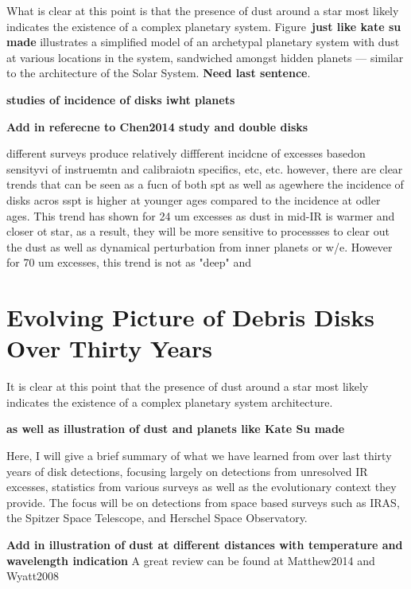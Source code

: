     What is clear at this point is that the presence of dust around a star most likely indicates the existence of a complex planetary system. Figure~\textbf{just like kate su made} illustrates a simplified model of an archetypal planetary system with dust at various locations in the system, sandwiched amongst hidden planets --- similar to the architecture of the Solar System. \textbf{Need last sentence}. 



\textbf{studies of incidence of disks iwht planets}    
    
\textbf{Add in referecne to Chen2014 study and double disks }


different surveys produce relatively diffferent incidcne of excesses basedon sensityvi of instruemtn and calibraiotn specifics, etc, etc. however, there are clear trends that can be seen as a fucn of both spt as well as agewhere the incidence of disks acros sspt is higher at younger ages compared to the incidence at odler ages. This trend has shown for 24 um excesses as dust in mid-IR is warmer and closer ot star, as a result, they will be more sensitive to processses to clear out the dust as well as dynamical perturbation from inner planets or w/e. However for 70 um excesses, this trend is not as "deep" and 

\section{Evolving Picture of Debris Disks Over Thirty Years}\label{sec:thirty_years}
       
    It is clear at this point that the presence of dust around a star most likely indicates the existence of a complex planetary system architecture.               

    \textbf{as well as illustration of dust and planets like Kate Su made}
    
          
     Here, I will give a brief summary of what we have learned from over last thirty years of disk detections, focusing largely on detections from unresolved IR excesses, statistics from various surveys as well as the evolutionary context they provide. The focus will be on detections from space based surveys such as IRAS, the Spitzer Space Telescope, and Herschel Space Observatory.  
    
    \textbf{Add in illustration of dust at different distances with temperature and wavelength indication}
   A great review can be found at Matthew2014 and Wyatt2008
   
